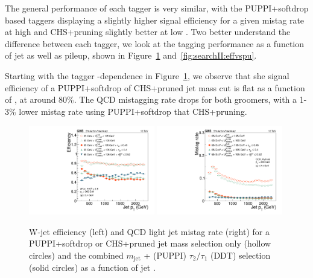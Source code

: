 The general performance of each tagger is very similar, with the PUPPI+softdrop based taggers displaying a slightly higher signal efficiency for a given mistag rate at high \PT and CHS+pruning slightly better at low \PT.
Two better understand the difference between each tagger, we look at the tagging performance as a function of jet \PT as well as pileup, shown in Figure~\ref{fig:searchII:effvspt} and~\ref{fig:searchII:effvspu}.\par
Starting with the tagger \PT-dependence in Figure~\ref{fig:searchII:effvspt}, we observe that she signal efficiency of a PUPPI+softdrop of CHS+pruned jet mass cut is flat as a function of \PT, at around 80\%. The QCD mistagging rate drops for both groomers, with a 1-3\% lower mistag rate using PUPPI+softdrop that CHS+pruning.

\begin{figure}[h!]
\centering
\includegraphics[width=0.49\textwidth]{figures/vtagging/JME-16-003/BoostedW/WtagSigEffvsPT.pdf}
\includegraphics[width=0.49\textwidth]{figures/vtagging/JME-16-003/BoostedW/QCDBkgEffvsPT.pdf}
\caption{W-jet efficiency (left) and QCD light jet mistag rate (right) for a PUPPI+softdrop or CHS+pruned jet mass selection only (hollow circles) and the combined $m_{\mathrm{jet}}$ + (PUPPI) $\tau_2/\tau_1$ (DDT) selection (solid circles) as a function of jet \PT.}
\label{fig:searchII:effvspt}
\end{figure}

